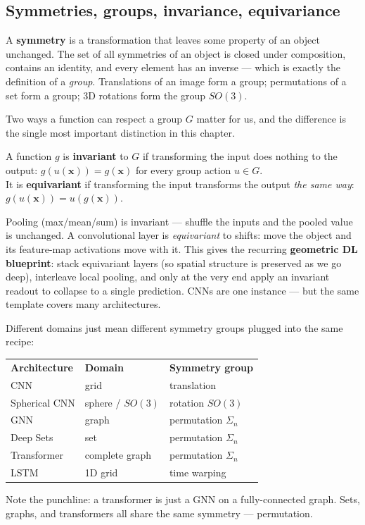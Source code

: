 \documentclass[11pt, oneside]{book}
\newcommand{\xvec}{\mathbf{x}}
\begin{document}
\subsection{Symmetries, groups, invariance, equivariance}

A \textbf{symmetry} is a transformation that leaves some property of an object
unchanged. The set of all symmetries of an object is closed under composition,
contains an identity, and every element has an inverse --- which is exactly the
definition of a \emph{group}. Translations of an image form a group; permutations
of a set form a group; 3D rotations form the group $SO(3)$.

Two ways a function can respect a group $G$ matter for us, and the difference is
the single most important distinction in this chapter.

\begin{defbox}[title={Invariance vs.\ equivariance}]
A function $g$ is \textbf{invariant} to $G$ if transforming the input does nothing
to the output: $g(u(\xvec)) = g(\xvec)$ for every group action $u\in G$.
\\[2pt]
It is \textbf{equivariant} if transforming the input transforms the output
\emph{the same way}: $g(u(\xvec)) = u(g(\xvec))$.
\end{defbox}

Pooling (max/mean/sum) is invariant --- shuffle the inputs and the pooled value is
unchanged. A convolutional layer is \emph{equivariant} to shifts: move the object
and its feature-map activations move with it. This gives the recurring
\textbf{geometric DL blueprint}: stack equivariant layers (so spatial structure is
preserved as we go deep), interleave local pooling, and only at the very end apply
an invariant readout to collapse to a single prediction. CNNs are one instance ---
but the same template covers many architectures.

\begin{exbox}[title={The 4G/5G: one blueprint, many architectures}]
Different domains just mean different symmetry groups plugged into the same recipe:
\begin{center}
\begin{tabular}{lll}
\textbf{Architecture} & \textbf{Domain} & \textbf{Symmetry group}\\
CNN              & grid             & translation\\
Spherical CNN    & sphere / $SO(3)$ & rotation $SO(3)$\\
GNN              & graph            & permutation $\Sigma_n$\\
Deep Sets        & set              & permutation $\Sigma_n$\\
Transformer      & complete graph   & permutation $\Sigma_n$\\
LSTM             & 1D grid          & time warping\\
\end{tabular}
\end{center}
Note the punchline: a transformer is just a GNN on a fully-connected graph. Sets,
graphs, and transformers all share the same symmetry --- permutation.
\end{exbox}
\end{document}
